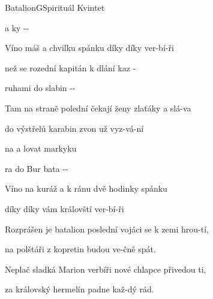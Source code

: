 \setcounter{page}{8}
\begin{song}{Batalion}{G}{Spirituál Kvintet}

\begin{SBChorus}
  a ky   -- 

Víno máš a chvilku spánku díky díky ver-bí-ři
\end{SBChorus}
\begin{SBVerse}
 než se rozední kapitán k dlání kaz -

ruhami do slabin  --

Tam na straně polední čekají ženy zlaťáky a slá-va

do výstřelů karabin zvon už vyz-vá-ní
\end{SBVerse}
\begin{SBChorus}
 na  a lovat markyku

ra do Bur bata --

Víno na kuráž a k ránu dvě hodinky spánku

díky díky vám královští ver-bí-ři

\end{SBChorus}
\begin{SBVerse}
Rozprášen je batalion poslední vojáci se k zemi hrou-tí, 

na polštáři z kopretin budou ve-čně spát.

Neplač sladká Marion verbíři nové chlapce přivedou ti,

za královský hermelín padne kaž-dý rád.
\end{SBVerse}
\end{song}
\pagebreak
